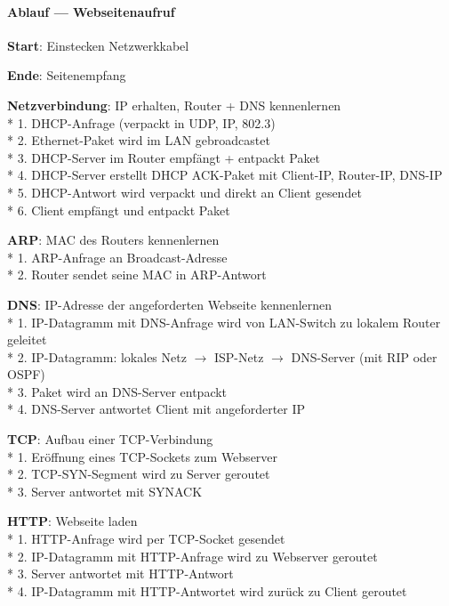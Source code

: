 \paragraph{Ablauf --- Webseitenaufruf}
\begin{items}
  \item \textbf{Start}: Einstecken Netzwerkkabel
  \item \textbf{Ende}: Seitenempfang
  \item \textbf{Netzverbindung}: IP erhalten, Router + DNS kennenlernen \\*
    1. DHCP-Anfrage (verpackt in UDP, IP, 802.3) \\*
    2. Ethernet-Paket wird im LAN gebroadcastet \\*
    3. DHCP-Server im Router empfängt + entpackt Paket \\*
    4. DHCP-Server erstellt DHCP ACK-Paket mit Client-IP, Router-IP, DNS-IP \\*
    5. DHCP-Antwort wird verpackt und direkt an Client gesendet \\*
    6. Client empfängt und entpackt Paket
  \item \textbf{ARP}: MAC des Routers kennenlernen \\*
    1. ARP-Anfrage an Broadcast-Adresse \\*
    2. Router sendet seine MAC in ARP-Antwort
  \item \textbf{DNS}: IP-Adresse der angeforderten Webseite kennenlernen \\*
    1. IP-Datagramm mit DNS-Anfrage wird von LAN-Switch zu lokalem Router geleitet \\*
    2. IP-Datagramm: lokales Netz \( \to \) ISP-Netz \( \to \) DNS-Server (mit RIP oder OSPF) \\*
    3. Paket wird an DNS-Server entpackt \\*
    4. DNS-Server antwortet Client mit angeforderter IP
  \item \textbf{TCP}: Aufbau einer TCP-Verbindung \\*
    1. Eröffnung eines TCP-Sockets zum Webserver \\*
    2. TCP-SYN-Segment wird zu Server geroutet \\*
    3. Server antwortet mit SYNACK
  \item \textbf{HTTP}: Webseite laden \\*
    1. HTTP-Anfrage wird per TCP-Socket gesendet \\*
    2. IP-Datagramm mit HTTP-Anfrage wird zu Webserver geroutet \\*
    3. Server antwortet mit HTTP-Antwort \\*
    4. IP-Datagramm mit HTTP-Antwortet wird zurück zu Client geroutet
\end{items}